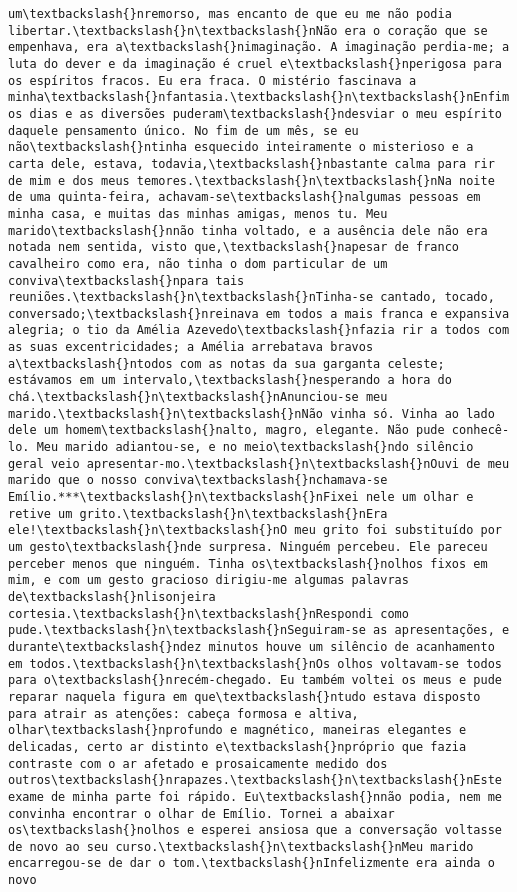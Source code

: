 \begin{Verbatim}[commandchars=\\\{\}]
um\textbackslash{}nremorso, mas encanto de que eu me não podia libertar.\textbackslash{}n\textbackslash{}nNão era o coração que se empenhava, era a\textbackslash{}nimaginação. A imaginação perdia-me; a luta do dever e da imaginação é cruel e\textbackslash{}nperigosa para os espíritos fracos. Eu era fraca. O mistério fascinava a minha\textbackslash{}nfantasia.\textbackslash{}n\textbackslash{}nEnfim os dias e as diversões puderam\textbackslash{}ndesviar o meu espírito daquele pensamento único. No fim de um mês, se eu não\textbackslash{}ntinha esquecido inteiramente o misterioso e a carta dele, estava, todavia,\textbackslash{}nbastante calma para rir de mim e dos meus temores.\textbackslash{}n\textbackslash{}nNa noite de uma quinta-feira, achavam-se\textbackslash{}nalgumas pessoas em minha casa, e muitas das minhas amigas, menos tu. Meu marido\textbackslash{}nnão tinha voltado, e a ausência dele não era notada nem sentida, visto que,\textbackslash{}napesar de franco cavalheiro como era, não tinha o dom particular de um conviva\textbackslash{}npara tais reuniões.\textbackslash{}n\textbackslash{}nTinha-se cantado, tocado, conversado;\textbackslash{}nreinava em todos a mais franca e expansiva alegria; o tio da Amélia Azevedo\textbackslash{}nfazia rir a todos com as suas excentricidades; a Amélia arrebatava bravos a\textbackslash{}ntodos com as notas da sua garganta celeste; estávamos em um intervalo,\textbackslash{}nesperando a hora do chá.\textbackslash{}n\textbackslash{}nAnunciou-se meu marido.\textbackslash{}n\textbackslash{}nNão vinha só. Vinha ao lado dele um homem\textbackslash{}nalto, magro, elegante. Não pude conhecê-lo. Meu marido adiantou-se, e no meio\textbackslash{}ndo silêncio geral veio apresentar-mo.\textbackslash{}n\textbackslash{}nOuvi de meu marido que o nosso conviva\textbackslash{}nchamava-se Emílio.***\textbackslash{}n\textbackslash{}nFixei nele um olhar e retive um grito.\textbackslash{}n\textbackslash{}nEra ele!\textbackslash{}n\textbackslash{}nO meu grito foi substituído por um gesto\textbackslash{}nde surpresa. Ninguém percebeu. Ele pareceu perceber menos que ninguém. Tinha os\textbackslash{}nolhos fixos em mim, e com um gesto gracioso dirigiu-me algumas palavras de\textbackslash{}nlisonjeira cortesia.\textbackslash{}n\textbackslash{}nRespondi como pude.\textbackslash{}n\textbackslash{}nSeguiram-se as apresentações, e durante\textbackslash{}ndez minutos houve um silêncio de acanhamento em todos.\textbackslash{}n\textbackslash{}nOs olhos voltavam-se todos para o\textbackslash{}nrecém-chegado. Eu também voltei os meus e pude reparar naquela figura em que\textbackslash{}ntudo estava disposto para atrair as atenções: cabeça formosa e altiva, olhar\textbackslash{}nprofundo e magnético, maneiras elegantes e delicadas, certo ar distinto e\textbackslash{}npróprio que fazia contraste com o ar afetado e prosaicamente medido dos outros\textbackslash{}nrapazes.\textbackslash{}n\textbackslash{}nEste exame de minha parte foi rápido. Eu\textbackslash{}nnão podia, nem me convinha encontrar o olhar de Emílio. Tornei a abaixar os\textbackslash{}nolhos e esperei ansiosa que a conversação voltasse de novo ao seu curso.\textbackslash{}n\textbackslash{}nMeu marido encarregou-se de dar o tom.\textbackslash{}nInfelizmente era ainda o novo 
\end{Verbatim}
